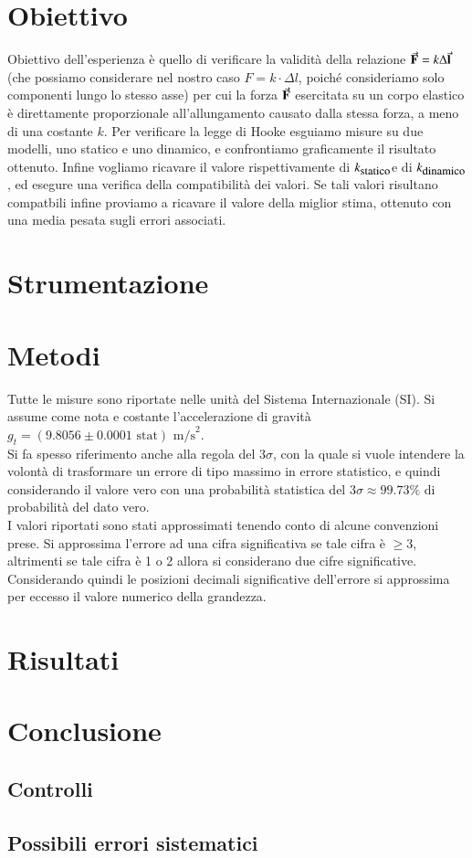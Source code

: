 \documentclass[italian, a4paper, 10pt, twocolumn]{../../style/lab_unige}
\newcommand{\gLab}{$g_t=(9.8056\pm0.0001 \text{ stat}) \text{ m/s}^2$\space}
\newcommand{\ks}{$k_{\text{\small statico}}$\space}
\newcommand{\kd}{$k_{\text{\small dinamico}}$\space}
\newcommand{\treSigma}{$3\sigma$\space}
\newcommand{\hookeLaw}{$F=k\cdot\Delta l$\space}
\begin{document}
    \section{Obiettivo}
    \label{section:aim}
    Obiettivo dell'esperienza è quello di verificare la validità della relazione $\va{F}=k\Delta\va{l}$ (che 
    possiamo considerare nel nostro caso \hookeLaw , poiché consideriamo solo componenti lungo lo stesso asse) 
    per cui la forza $\va{F}$ esercitata su un corpo elastico è direttamente proporzionale all'allungamento 
    causato dalla stessa forza, a meno di una costante $k$.
    Per verificare la legge di Hooke esguiamo misure su due modelli, uno statico e uno dinamico, e confrontiamo 
    graficamente il risultato ottenuto. Infine vogliamo ricavare il valore rispettivamente di \ks e di \kd, ed
    esegure una verifica della compatibilità dei valori. Se tali valori risultano compatbili infine proviamo a 
    ricavare il valore della miglior stima, ottenuto con una media pesata sugli errori associati.

    \section{Strumentazione}
    \label{section:strument}

    \section{Metodi}
    \label{section:methods}
    Tutte le misure sono riportate nelle unità del Sistema Internazionale (SI). Si assume come nota e costante 
    l'accelerazione di gravità \gLab .\\

    Si fa spesso riferimento anche alla regola del \treSigma, con la quale si vuole intendere la volontà di 
    trasformare un errore di tipo massimo in errore statistico, e quindi considerando il valore vero con una
    probabilità statistica del \treSigma $\approx99.73\%$ di probabilità del dato vero.\\
    I valori riportati sono stati approssimati tenendo conto di alcune convenzioni prese. Si approssima 
    l'errore ad una cifra significativa se tale cifra è $\geqslant3$, altrimenti se tale cifra è 1 o 2 allora
    si considerano due cifre significative. Considerando quindi le posizioni decimali significative dell'errore
    si approssima per eccesso il valore numerico della grandezza. 

    \section{Risultati}
    \label{section:results}

    \section{Conclusione}
    \label{section:conclusion}

    \subsection{Controlli}

    \subsection{Possibili errori sistematici}
    
\end{document}
